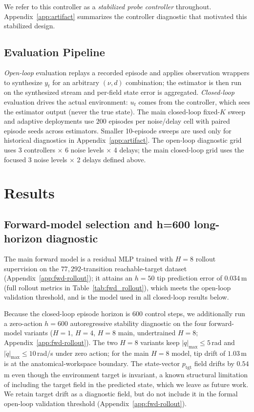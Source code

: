 \documentclass[sn-mathphys,NameDate,iicol]{sn-jnl}
\begin{document}
We refer to this controller as a \emph{stabilized probe controller}
throughout. Appendix~\ref{app:artifact} summarizes the controller
diagnostic that motivated this stabilized design.

\subsection{Evaluation Pipeline}
\emph{Open-loop} evaluation replays a recorded episode and applies
observation wrappers to synthesize $y_t$ for an arbitrary $(\nu, d)$
combination; the estimator is then run on the synthesized stream and
per-field state error is aggregated. \emph{Closed-loop} evaluation drives
the actual environment: $u_t$ comes from the controller, which sees the estimator
output (never the true state). The main closed-loop fixed-$K$ sweep and
adaptive deployments use $200$ episodes per noise/delay cell with
paired episode seeds across estimators. Smaller 10-episode sweeps are
used only for historical diagnostics in Appendix~\ref{app:artifact}.
The open-loop diagnostic grid uses 3 controllers $\times$ 6 noise
levels $\times$ 4 delays; the main closed-loop grid uses the focused
3 noise levels $\times$ 2 delays defined above.

\section{Results}
\label{sec:results}

\subsection{Forward-model selection and h=600 long-horizon diagnostic}
\label{sec:results-forward-model}

The main forward model is a residual MLP trained with $H{=}8$ rollout
supervision on the $77{,}292$-transition reachable-target dataset
(Appendix~\ref{app:fwd-rollout}); it attains an
$h{=}50$ tip prediction error of $0.034$\,m
(full rollout metrics in Table~\ref{tab:fwd_rollout}),
which meets the open-loop validation threshold, and
is the model used in all closed-loop results below.

Because the closed-loop episode horizon is $600$ control steps, we
additionally run a zero-action $h{=}600$ autoregressive stability
diagnostic on the four forward-model variants
($H{=}1$, $H{=}4$, $H{=}8$ main, undertrained $H{=}8$;
Appendix~\ref{app:fwd-rollout}). The two $H{=}8$ variants keep
$|q|_{\max}\!\leq\!5$\,rad and
$|\dot q|_{\max}\!\leq\!10$\,rad/s under zero action; for the main
$H{=}8$ model, tip drift of $1.03$\,m is at the anatomical-workspace
boundary. The
state-vector $p_{\mathrm{tgt}}$ field drifts by $0.54$\,m even though
the environment target is invariant, a known structural limitation of
including the target field in the predicted state, which we leave as
future work.
We retain target drift as a diagnostic field, but do not include it
in the formal open-loop validation threshold
(Appendix~\ref{app:fwd-rollout}).
\end{document}
